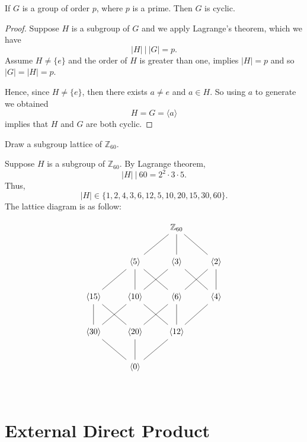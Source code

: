 \begin{theorem}
    If $G$ is a group of order $p$, where $p$ is a prime. Then $G$ is cyclic.
\end{theorem}
\begin{proof}
    Suppose $H$ is a subgroup of $G$ and we apply Lagrange's theorem, which we have 
    \[
        |H| \> \big \vert \> |G| = p.
    \]
    Assume $H \neq \{ e \}$ and the order of $H$ is greater than one, implies $|H| = p$ and so $|G| = |H| = p$.

    Hence, since $H \neq \{ e \}$, then there exists $a \neq e$ and $a \in H$. So using $a$ to generate we obtained
    \[
        H = G = \langle a \rangle
    \]
    implies that $H$ and $G$ are both cyclic.
\end{proof}

\begin{example}[Tutorial]
    Draw a subgroup lattice of $\mathbb{Z}_{60}$.
\end{example}
\begin{solution}
    Suppose $H$ is a subgroup of $\mathbb{Z}_{60}$. By Lagrange theorem, 
    \[
        |H| \> \big \vert \> 60 = 2^2 \cdot 3 \cdot 5.
    \]
    Thus, 
    \[
        |H| \in \{1, 2, 4, 3, 6, 12, 5, 10, 20, 15, 30, 60 \}.
    \]
    The lattice diagram is as follow:

    \[
        \begin{tikzcd}[row sep=2.5em]
            & & \mathbb{Z}_{60} \arrow[dash]{dl} \arrow[dash]{d} \arrow[dash]{dr} & \\
            & \langle 5 \rangle \arrow[dash]{dl} \arrow[dash]{d} \arrow[dash]{dr} & \langle 3\rangle \arrow[dash]{dl} \arrow[dash]{dr}& \langle 2 \rangle \arrow[dash]{dl} \arrow[dash]{d}\\
            \langle 15 \rangle \arrow[dash]{d} \arrow[dash]{dr} & \langle 10 \rangle \arrow[dash]{dl} \arrow[dash]{dr} & \langle 6 \rangle \arrow[dash]{dl} \arrow[dash]{d} & \langle 4 \rangle \arrow[dash]{dl}\\
            \langle 30 \rangle \arrow[dash]{dr} & \langle 20 \rangle \arrow[dash]{d} & \langle 12\rangle \arrow[dash]{dl} & \\
            & \langle 0 \rangle & & \\
        \end{tikzcd}
    \]
\end{solution}

\section{External Direct Product}

